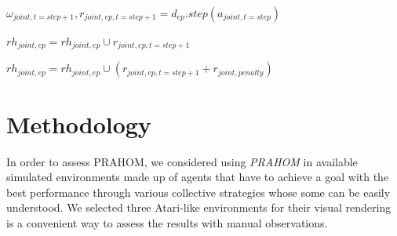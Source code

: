 \documentclass{ecai}
\begin{document}
\begin{algorithm}[hbt!]
{{{                

                $\omega_{joint,t=step+1}, r_{joint,ep,t=step+1} = d_{ep}.step(a_{joint,t=step})$

                $rh_{joint,ep} = rh_{joint,ep} \cup r_{joint,ep,t=step+1}$


                $rh_{joint,ep} = rh_{joint,ep} \cup (r_{joint,ep,t=step+1} + r_{joint, penalty})$

            }


        }

    }

\end{algorithm}


\section{Methodology}


In order to assess PRAHOM, we considered using \emph{PRAHOM} in available simulated environments made up of agents that have to achieve a goal with the best performance through various collective strategies whose some can be easily understood.
We selected three Atari-like environments for their visual rendering is a convenient way to assess the results with manual observations\footnotemark[1].

\end{document}
